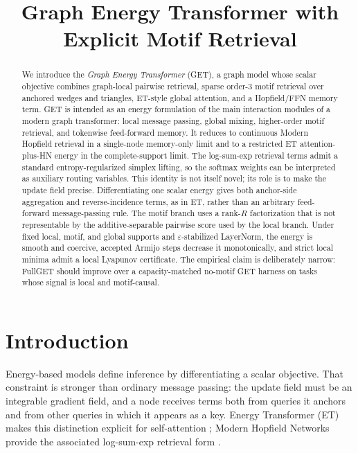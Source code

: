 \documentclass[11pt,a4paper]{article}
\title{Graph Energy Transformer with Explicit Motif Retrieval}
\author{}
\date{}
\begin{document}
\maketitle

\begin{abstract}
We introduce the \emph{Graph Energy Transformer} (GET), a graph model whose
scalar objective combines graph-local pairwise retrieval, sparse order-3 motif
retrieval over anchored wedges and triangles, ET-style global attention, and a
Hopfield/FFN memory term. GET is intended as an energy formulation of the main
interaction modules of a modern graph transformer: local message passing,
global mixing, higher-order motif retrieval, and tokenwise feed-forward memory.
It reduces to continuous Modern Hopfield retrieval in a single-node memory-only
limit and to a restricted ET attention-plus-HN energy in the complete-support
limit. The log-sum-exp retrieval terms admit a standard entropy-regularized
simplex lifting, so the softmax weights can be interpreted as auxiliary routing
variables. This identity is not itself novel; its role is to make the update
field precise. Differentiating one scalar energy gives both anchor-side
aggregation and reverse-incidence terms, as in ET, rather than an arbitrary
feed-forward message-passing rule. The motif branch uses a rank-$R$
factorization that is not representable by the additive-separable pairwise
score used by the local branch. Under fixed local, motif, and global supports
and $\varepsilon$-stabilized LayerNorm, the energy is smooth and coercive,
accepted Armijo steps decrease it monotonically, and strict local minima admit
a local Lyapunov certificate. The empirical claim is deliberately narrow:
FullGET should improve over a capacity-matched no-motif GET harness on tasks
whose signal is local and motif-causal.
\end{abstract}

\section{Introduction}

Energy-based models define inference by differentiating a scalar objective.
That constraint is stronger than ordinary message passing: the update field
must be an integrable gradient field, and a node receives terms both from
queries it anchors and from other queries in which it appears as a key.
Energy Transformer (ET) makes this distinction explicit for self-attention
\citep{hoover2023energy}; Modern Hopfield Networks provide the associated
log-sum-exp retrieval form \citep{ramsauer2021hopfield}.
\end{document}
